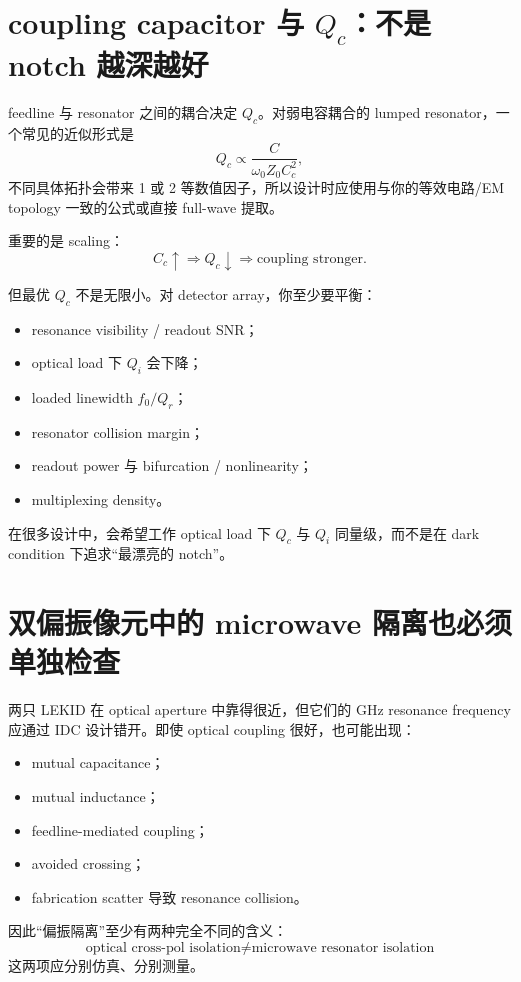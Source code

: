 \documentclass[11pt,a4paper,openany]{ctexrep}
\begin{document}
\section{coupling capacitor 与 $Q_c$：不是 notch 越深越好}

feedline 与 resonator 之间的耦合决定 $Q_c$。对弱电容耦合的 lumped resonator，一个常见的近似形式是
\[
Q_c\propto\frac{C}{\omega_0 Z_0 C_c^2},
\]
不同具体拓扑会带来 1 或 2 等数值因子，所以设计时应使用与你的等效电路/EM topology 一致的公式或直接 full-wave 提取。

重要的是 scaling：
\[
C_c\uparrow\Rightarrow Q_c\downarrow\Rightarrow\text{coupling stronger}.
\]

但最优 $Q_c$ 不是无限小。对 detector array，你至少要平衡：
\begin{itemize}
  \item resonance visibility / readout SNR；
  \item optical load 下 $Q_i$ 会下降；
  \item loaded linewidth $f_0/Q_r$；
  \item resonator collision margin；
  \item readout power 与 bifurcation / nonlinearity；
  \item multiplexing density。
\end{itemize}

在很多设计中，会希望工作 optical load 下 $Q_c$ 与 $Q_i$ 同量级，而不是在 dark condition 下追求“最漂亮的 notch”。

\section{双偏振像元中的 microwave 隔离也必须单独检查}

两只 LEKID 在 optical aperture 中靠得很近，但它们的 GHz resonance frequency 应通过 IDC 设计错开。即使 optical coupling 很好，也可能出现：
\begin{itemize}
  \item mutual capacitance；
  \item mutual inductance；
  \item feedline-mediated coupling；
  \item avoided crossing；
  \item fabrication scatter 导致 resonance collision。
\end{itemize}

因此“偏振隔离”至少有两种完全不同的含义：
\[
\boxed{
\text{optical cross-pol isolation}
\neq
\text{microwave resonator isolation}
}
\]
这两项应分别仿真、分别测量。
\end{document}
